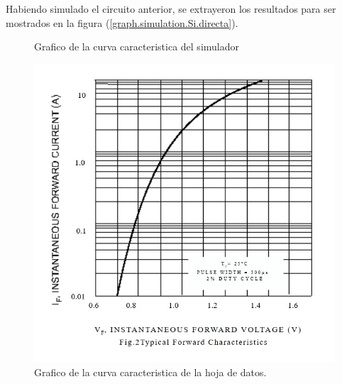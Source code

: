 \documentclass[chaptersright]{informeutn}
\begin{document}
        Habiendo simulado el circuito anterior, se extrayeron los resultados para ser mostrados en la figura
        (\ref{graph.simulation.Si.directa}).

        \begin{figure}[!ht]
          \centering
          \begin{minipage}{0.45\textwidth}
            \caption{Grafico de la curva caracteristica del simulador}
            \label{graph.simulation.Si.directa}
          \end{minipage}
          \hfill
          \begin{minipage}{0.45\textwidth}
            \includegraphics[width=1\textwidth]{pictures/Curva_Datash_Si.jpg}
            \caption{Grafico de la curva caracteristica de la hoja de datos.}
            \label{graph.datasheet.Si.directa}
          \end{minipage}
        \end{figure}
\end{document}

